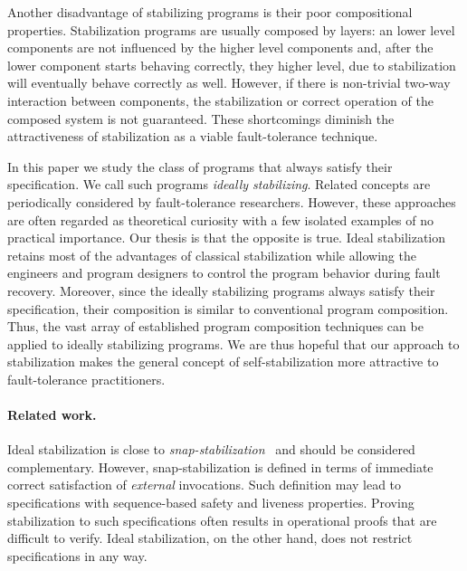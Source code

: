 \documentclass[11pt]{llncs}
\begin{document}
Another disadvantage of stabilizing programs is their poor
compositional properties. Stabilization programs are usually composed
by layers: an lower level components are not influenced by the higher
level components and, after the lower component starts behaving
correctly, they higher level, due to stabilization will eventually
behave correctly as well. However, if there is non-trivial two-way
interaction between components, the stabilization or correct operation
of the composed system is not guaranteed.  These shortcomings diminish
the attractiveness of stabilization as a viable fault-tolerance
technique.


In this paper we study the class of programs that always satisfy their
specification. We call such programs \emph{ideally
  stabilizing}. Related concepts are periodically considered by
fault-tolerance researchers. However, these approaches are often
regarded as theoretical curiosity with a few isolated examples of no
practical importance. Our thesis is that the opposite is true. Ideal
stabilization retains most of the advantages of classical
stabilization while allowing the engineers and program designers to
control the program behavior during fault recovery. Moreover, since
the ideally stabilizing programs always satisfy their specification,
their composition is similar to conventional program
composition. Thus, the vast array of established program composition
techniques can be applied to ideally stabilizing programs. We are thus
hopeful that our approach to stabilization makes the general concept
of self-stabilization more attractive to fault-tolerance
practitioners.



\paragraph{Related work.} Ideal stabilization is close to
\emph{snap-stabilization}~\cite{BDPV99c,DDNT08c} and should be
considered complementary. However, snap-stabilization is defined in
terms of immediate correct satisfaction of \emph{external}
invocations. Such definition may lead to specifications with
sequence-based safety and liveness properties. Proving stabilization
to such specifications often results in operational proofs that are
difficult to verify. Ideal stabilization, on the other hand, does not
restrict specifications in any way.
\end{document}
